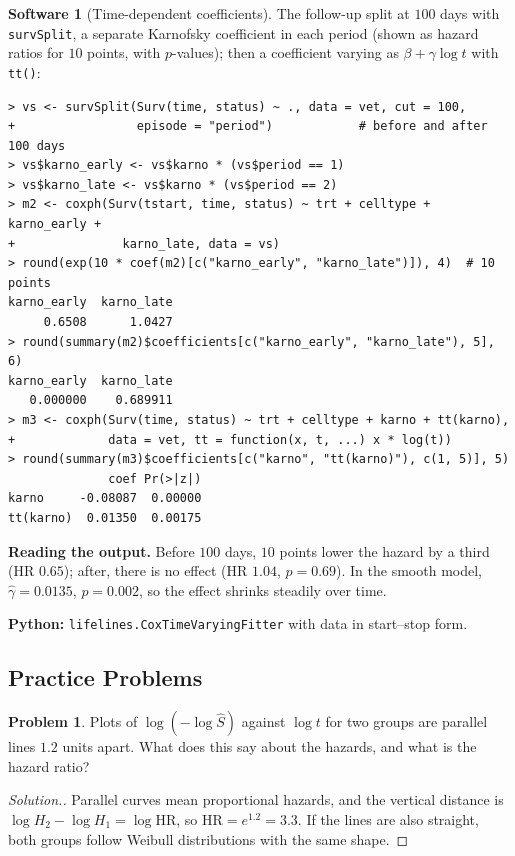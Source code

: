 \documentclass[11pt,a4paper]{article}
\numberwithin{equation}{section}
\theoremstyle{definition}
\newtheorem{software}[thm]{Software}
\newtheorem{problemx}{Problem}[subsection]
\newenvironment{problem}{\begin{problemx}}{\end{problemx}}
\newenvironment{solution}
  {\renewcommand{\qedsymbol}{}\begin{proof}[\textit{Solution}.]}
  {\end{proof}}
\begin{document}
\begin{software}[Time-dependent coefficients]
\label{sw:split}
The follow-up split at $100$ days with \texttt{survSplit}, a separate Karnofsky coefficient in each period (shown as hazard ratios for $10$ points, with $p$-values); then a coefficient varying as $\beta + \gamma\log t$ with \texttt{tt()}:
{\small\begin{verbatim}
> vs <- survSplit(Surv(time, status) ~ ., data = vet, cut = 100,
+                 episode = "period")            # before and after 100 days
> vs$karno_early <- vs$karno * (vs$period == 1)
> vs$karno_late <- vs$karno * (vs$period == 2)
> m2 <- coxph(Surv(tstart, time, status) ~ trt + celltype + karno_early +
+               karno_late, data = vs)
> round(exp(10 * coef(m2)[c("karno_early", "karno_late")]), 4)  # 10 points
karno_early  karno_late 
     0.6508      1.0427 
> round(summary(m2)$coefficients[c("karno_early", "karno_late"), 5], 6)
karno_early  karno_late 
   0.000000    0.689911 
> m3 <- coxph(Surv(time, status) ~ trt + celltype + karno + tt(karno),
+             data = vet, tt = function(x, t, ...) x * log(t))
> round(summary(m3)$coefficients[c("karno", "tt(karno)"), c(1, 5)], 5)
              coef Pr(>|z|)
karno     -0.08087  0.00000
tt(karno)  0.01350  0.00175
\end{verbatim}}
\textbf{Reading the output.} Before $100$ days, $10$ points lower the hazard by a third (HR $0.65$); after, there is no effect (HR $1.04$, $p = 0.69$). In the smooth model, $\hat\gamma = 0.0135$, $p = 0.002$, so the effect shrinks steadily over time.

\textbf{Python:} \texttt{lifelines.CoxTimeVaryingFitter} with data in start--stop form.
\end{software}

\subsection{Practice Problems}

\begin{problem}
Plots of $\log(-\log\hat S)$ against $\log t$ for two groups are parallel lines $1.2$ units apart. What does this say about the hazards, and what is the hazard ratio?
\end{problem}

\begin{solution}
Parallel curves mean proportional hazards, and the vertical distance is $\log H_2 - \log H_1 = \log\text{HR}$, so $\text{HR} = e^{1.2} = 3.3$. If the lines are also straight, both groups follow Weibull distributions with the same shape.
\end{solution}
\end{document}
